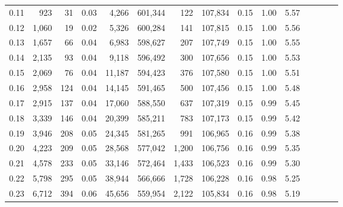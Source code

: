 \begin{tabular}{rrrcrrrrrrrrrrr}
0.11 &     923 &     31 &                                       0.03 &    4,266 &  601,344 &      122 &  107,834 &  0.15 &  1.00 &                         5.57 \\
0.12 &   1,060 &     19 &                                       0.02 &    5,326 &  600,284 &      141 &  107,815 &  0.15 &  1.00 &                         5.56 \\
0.13 &   1,657 &     66 &                                       0.04 &    6,983 &  598,627 &      207 &  107,749 &  0.15 &  1.00 &                         5.55 \\
0.14 &   2,135 &     93 &                                       0.04 &    9,118 &  596,492 &      300 &  107,656 &  0.15 &  1.00 &                         5.53 \\
0.15 &   2,069 &     76 &                                       0.04 &   11,187 &  594,423 &      376 &  107,580 &  0.15 &  1.00 &                         5.51 \\
0.16 &   2,958 &    124 &                                       0.04 &   14,145 &  591,465 &      500 &  107,456 &  0.15 &  1.00 &                         5.48 \\
0.17 &   2,915 &    137 &                                       0.04 &   17,060 &  588,550 &      637 &  107,319 &  0.15 &  0.99 &                         5.45 \\
0.18 &   3,339 &    146 &                                       0.04 &   20,399 &  585,211 &      783 &  107,173 &  0.15 &  0.99 &                         5.42 \\
0.19 &   3,946 &    208 &                                       0.05 &   24,345 &  581,265 &      991 &  106,965 &  0.16 &  0.99 &                         5.38 \\
0.20 &   4,223 &    209 &                                       0.05 &   28,568 &  577,042 &    1,200 &  106,756 &  0.16 &  0.99 &                         5.35 \\
0.21 &   4,578 &    233 &                                       0.05 &   33,146 &  572,464 &    1,433 &  106,523 &  0.16 &  0.99 &                         5.30 \\
0.22 &   5,798 &    295 &                                       0.05 &   38,944 &  566,666 &    1,728 &  106,228 &  0.16 &  0.98 &                         5.25 \\
0.23 &   6,712 &    394 &                                       0.06 &   45,656 &  559,954 &    2,122 &  105,834 &  0.16 &  0.98 &                         5.19 \\

\end{tabular}
